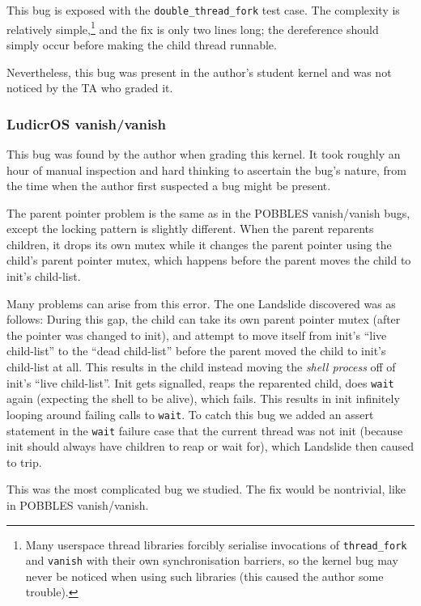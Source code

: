 This bug is exposed with the \texttt{double\_thread\_fork} test case. The complexity is relatively simple,\footnote{
Many userspace thread libraries forcibly serialise invocations of \texttt{thread\_fork} and \texttt{vanish} with their own synchronisation barriers, so the kernel bug may never be noticed when using such libraries (this caused the author some trouble).}
and the fix is only two lines long; the dereference should simply occur before making the child thread runnable.

Nevertheless, this bug was present in the author's student kernel and was not noticed by the TA who graded it.

\subsubsection{LudicrOS vanish/vanish}
\label{sec:eval-ludicros-vanish}

This bug was found by the author when grading this kernel. It took roughly an hour of manual inspection and hard thinking to ascertain the bug's nature, from the time when the author first suspected a bug might be present.

The parent pointer problem is the same as in the POBBLES vanish/vanish bugs, except the locking pattern is slightly different. When the parent reparents children, it drops its own mutex while it changes the parent pointer using the child's parent pointer mutex, which happens before the parent moves the child to init's child-list.

Many problems can arise from this error. The one Landslide discovered was as follows: During this gap, the child can take its own parent pointer mutex (after the pointer was changed to init), and attempt to move itself from init's ``live child-list'' to the ``dead child-list'' before the parent moved the child to init's child-list at all. This results in the child instead moving the {\em shell process} off of init's ``live child-list''. Init gets signalled, reaps the reparented child, does \texttt{wait} again (expecting the shell to be alive), which fails. This results in init infinitely looping around failing calls to \texttt{wait}. To catch this bug  we added an assert statement in the \texttt{wait} failure case that the current thread was not init (because init should always have children to reap or wait for), which Landslide then caused to trip.

This was the most complicated bug we studied. The fix would be nontrivial, like in POBBLES vanish/vanish.

